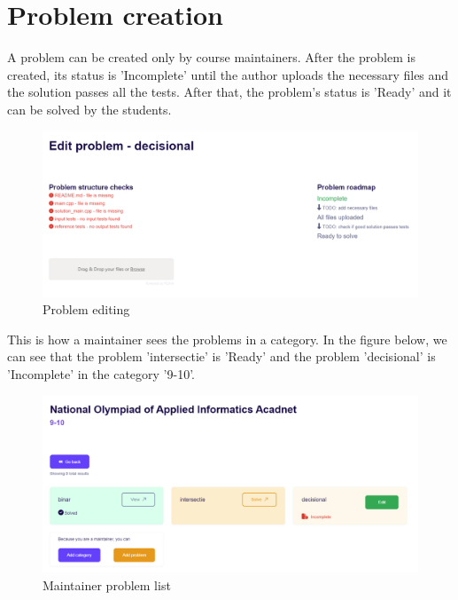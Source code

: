 \documentclass[12pt,a4paper]{report}
\begin{document}
\newpage
\section{Problem creation}
A problem can be created only by course maintainers. After the problem is created, its status is 'Incomplete' until the author uploads the necessary files and the solution passes all the tests. After that, the problem's status is 'Ready' and it can be solved by the students.

\begin{figure}[h]
	\centering
	\includegraphics[width=\linewidth]{./pics/empty-problem.png}
	\caption{Problem editing}
	\label{fig:problem-editing}
\end{figure}

This is how a maintainer sees the problems in a category. In the figure below, we can see that the problem 'intersectie' is 'Ready' and the problem 'decisional' is 'Incomplete' in the category '9-10'.

\begin{figure}[h]
	\centering
	\includegraphics[width=\linewidth]{./pics/maintainer-problem-list.png}
	\caption{Maintainer problem list}
	\label{fig:maintainer-problem-list}
\end{figure}

\newpage
\end{document}
